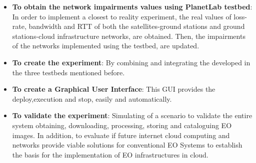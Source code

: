\begin{itemize}
\item {\textbf{To obtain the network impairments values using PlanetLab testbed}: In
    order to implement a closest to reality experiment, the real values of
    loss-rate, bandwidth and \ac{RTT} of both the satellites-ground stations and
    ground stations-cloud infrastructure networks, are obtained. Then, the
    impairments of the networks implemented using the \vw testbed, are updated.}

\item {\textbf{To create the experiment}: By combining and integrating
  the developed in the three testbeds mentioned before.}

\item {\textbf{To create a Graphical User Interface}: This \ac{GUI} provides
  the deploy,execution and stop, easily and automatically.}

\item {\textbf{To validate the experiment}: Simulating of a scenario to validate the
  entire system obtaining, downloading, processing, storing and cataloguing
  \ac{EO} images. In addition,  to evaluate if future internet cloud computing
  and networks provide viable solutions for conventional \ac{EO}
  Systems to establish the basis for the implementation of \ac{EO}
  infrastructures in
  cloud. }

\end{itemize}
